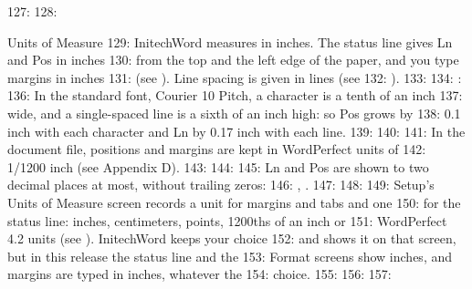 127: 
128: \begin{Feature}{Units of Measure}
129: InitechWord measures in inches.  The status line gives Ln and Pos in inches
130: from the top and the left edge of the paper, and you type margins in inches
131: (see ).  Line spacing is given in lines (see
132: ).
133: 
134: : 
136: In the standard font, Courier 10 Pitch, a character is a tenth of an inch
137: wide, and a single-spaced line is a sixth of an inch high: so Pos grows by
138: 0.1 inch with each character and Ln by 0.17 inch with each line.
139: 
140: 
141: In the document file, positions and margins are kept in WordPerfect units of
142: 1/1200 inch (see Appendix D).
143: 
144: 
145: Ln and Pos are shown to two decimal places at most, without trailing zeros:
146: , .
147: 
148: 
149: Setup's Units of Measure screen records a unit for margins and tabs and one
150: for the status line: inches, centimeters, points, 1200ths of an inch or
151: WordPerfect 4.2 units (see ).  InitechWord keeps your choice
152: and shows it on that screen, but in this release the status line and the
153: Format screens show inches, and margins are typed in inches, whatever the
154: choice.
155: 
156: 
157: \end{Feature}
